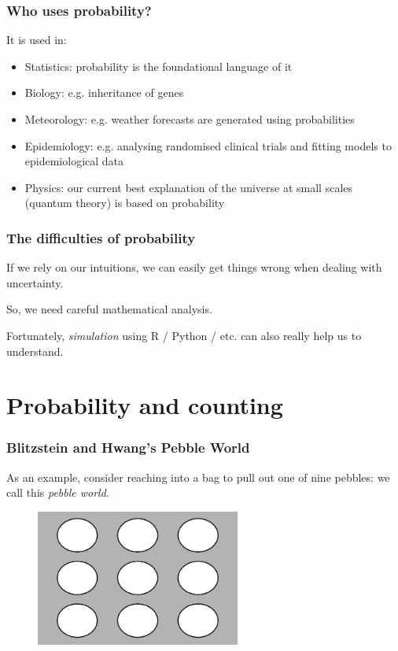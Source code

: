 \documentclass{beamer}
\begin{document}
	\begin{frame}
		\frametitle{Who uses probability?}
		It is used in:
		
		\begin{itemize}
			\item Statistics: probability is the foundational language of it
			\item Biology: e.g. inheritance of genes
			\item Meteorology: e.g. weather forecasts are generated using probabilities
			\item Epidemiology: e.g. analysing randomised clinical trials and fitting models to epidemiological data
			\item Physics: our current best explanation of the universe at small scales (quantum theory) is based on probability
		\end{itemize}
		
		
	\end{frame}

	\begin{frame}
		\frametitle{The difficulties of probability}
		
		If we rely on our intuitions, we can easily get things wrong when dealing with uncertainty.
		
		\vspace{0.5cm}
		
		 So, we need careful mathematical analysis.
		 
		 \vspace{0.5cm}
		
		Fortunately, \textit{simulation} using R / Python / etc. can also really help us to understand.
		
	\end{frame}

	\section{Probability and counting}
	\frame{\tableofcontents[currentsection]}
	
	\begin{frame}
		\frametitle{Blitzstein and Hwang's Pebble World}
		
		As an example, consider reaching into a bag to pull out one of nine pebbles: we call this \textit{pebble world}.
		
		\begin{figure}[ht]
			\centerline{\includegraphics[width=0.6\textwidth]{./figures/pebble_world_base.png}}
		\end{figure}
		
	\end{frame}
\end{document}
